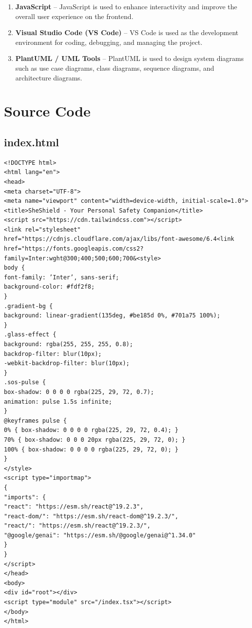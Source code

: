 \documentclass[a4paper,12pt]{report}
\begin{document}
\begin{enumerate}
\item \textbf{JavaScript} – JavaScript is used to enhance interactivity and improve the overall user experience on the frontend.

\item \textbf{Visual Studio Code (VS Code)} – VS Code is used as the development environment for coding, debugging, and managing the project.

\item \textbf{PlantUML / UML Tools} – PlantUML is used to design system diagrams such as use case diagrams, class diagrams, sequence diagrams, and architecture diagrams.

\end{enumerate}


\section{Source Code}
\subsection{index.html}


\begin{lstlisting}
<!DOCTYPE html>
<html lang="en">
<head>
<meta charset="UTF-8">
<meta name="viewport" content="width=device-width, initial-scale=1.0">
<title>SheShield - Your Personal Safety Companion</title>
<script src="https://cdn.tailwindcss.com"></script>
<link rel="stylesheet" href="https://cdnjs.cloudflare.com/ajax/libs/font-awesome/6.4<link href="https://fonts.googleapis.com/css2?family=Inter:wght@300;400;500;600;700&<style>
body {
font-family: ’Inter’, sans-serif;
background-color: #fdf2f8;
}
.gradient-bg {
background: linear-gradient(135deg, #be185d 0%, #701a75 100%);
}
.glass-effect {
background: rgba(255, 255, 255, 0.8);
backdrop-filter: blur(10px);
-webkit-backdrop-filter: blur(10px);
}
.sos-pulse {
box-shadow: 0 0 0 0 rgba(225, 29, 72, 0.7);
animation: pulse 1.5s infinite;
}
@keyframes pulse {
0% { box-shadow: 0 0 0 0 rgba(225, 29, 72, 0.4); }
70% { box-shadow: 0 0 0 20px rgba(225, 29, 72, 0); }
100% { box-shadow: 0 0 0 0 rgba(225, 29, 72, 0); }
}
</style>
<script type="importmap">
{
"imports": {
"react": "https://esm.sh/react@^19.2.3",
"react-dom/": "https://esm.sh/react-dom@^19.2.3/",
"react/": "https://esm.sh/react@^19.2.3/",
"@google/genai": "https://esm.sh/@google/genai@^1.34.0"
}
}
</script>
</head>
<body>
<div id="root"></div>
<script type="module" src="/index.tsx"></script>
</body>
</html>

\end{lstlisting}
\end{document}
